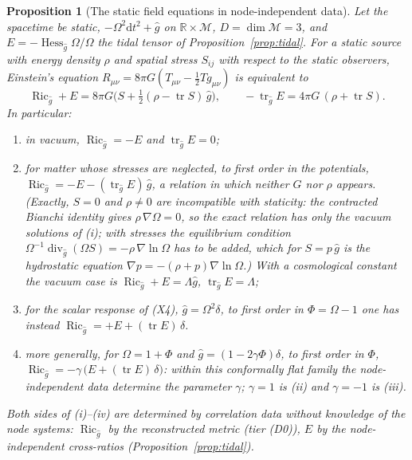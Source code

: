 \documentclass[a4paper,11pt]{article}
\newtheorem{proposition}[theorem]{Proposition}
\theoremstyle{definition}
\theoremstyle{remark}
\DeclareMathOperator{\tr}{tr}
\newcommand{\M}{\mathcal{M}}
\newcommand{\R}{\mathbb{R}}
\newcommand{\dd}{\mathrm{d}}
\DeclareMathOperator{\Ric}{Ric}
\begin{document}
\begin{proposition}[The static field equations in node-independent data]\label{prop:static-test}
Let the spacetime be static, $-\Omega^2\dd t^2+\hat g$ on $\R\times\M$, $D=\dim\M=3$, and $E=-\operatorname{Hess}_{\hat g}\Omega/\Omega$ the tidal tensor of Proposition~\ref{prop:tidal}. For a static source with energy density $\rho$ and spatial stress $S_{ij}$ with respect to the static observers, Einstein's equation $R_{\mu\nu}=8\pi G(T_{\mu\nu}-\tfrac12Tg_{\mu\nu})$ is equivalent to
\begin{equation}\label{eq:static-test}
\Ric_{\hat g}+E=8\pi G\Big(S+\tfrac12(\rho-\tr S)\,\hat g\Big),\qquad -\tr_{\hat g}E=4\pi G\,(\rho+\tr S).
\end{equation}
In particular:
\begin{enumerate}
\item[(i)] in vacuum, $\Ric_{\hat g}=-E$ and $\tr_{\hat g}E=0$;
\item[(ii)] for matter whose stresses are neglected, to first order in the potentials, $\Ric_{\hat g}=-E-(\tr_{\hat g}E)\,\hat g$, a relation in which neither $G$ nor $\rho$ appears. (Exactly, $S=0$ and $\rho\ne0$ are incompatible with staticity: the contracted Bianchi identity gives $\rho\,\nabla\Omega=0$, so the exact relation has only the vacuum solutions of \textup{(i)}; with stresses the equilibrium condition $\Omega^{-1}\operatorname{div}_{\hat g}(\Omega S)=-\rho\,\nabla\ln\Omega$ has to be added, which for $S=p\,\hat g$ is the hydrostatic equation $\nabla p=-(\rho+p)\nabla\ln\Omega$.) With a cosmological constant the vacuum case is $\Ric_{\hat g}+E=\Lambda\hat g$, $\tr_{\hat g}E=\Lambda$;
\item[(iii)] for the scalar response of \textup{(X4)}, $\hat g=\Omega^2\delta$, to first order in $\Phi=\Omega-1$ one has instead $\Ric_{\hat g}=+E+(\tr E)\,\delta$.
\item[(iv)] more generally, for $\Omega=1+\Phi$ and $\hat g=(1-2\gamma\Phi)\delta$, to first order in $\Phi$, $\Ric_{\hat g}=-\gamma\,\big(E+(\tr E)\,\delta\big)$: within this conformally flat family the node-independent data determine the parameter $\gamma$; $\gamma=1$ is \textup{(ii)} and $\gamma=-1$ is \textup{(iii)}.
\end{enumerate}
Both sides of \textup{(i)}--\textup{(iv)} are determined by correlation data without knowledge of the node systems: $\Ric_{\hat g}$ by the reconstructed metric (tier \textup{(D0)}), $E$ by the node-independent cross-ratios (Proposition~\ref{prop:tidal}).
\end{proposition}
\end{document}
